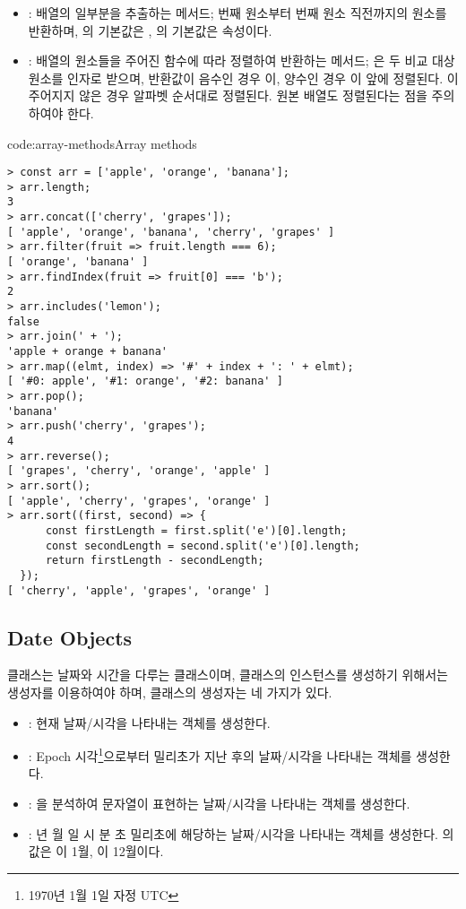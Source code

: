 \begin{itemize}
    \item {}: 배열의 일부분을 추출하는 메서드; 번째 원소부터 번째 원소 직전까지의 원소를 반환하며, 의 기본값은 , 의 기본값은  속성이다.
    \item {}: 배열의 원소들을 주어진 함수에 따라 정렬하여 반환하는 메서드; 은 두 비교 대상 원소를 인자로 받으며, 반환값이 음수인 경우 이, 양수인 경우 이 앞에 정렬된다. 이 주어지지 않은 경우 알파벳 순서대로 정렬된다. 원본 배열도 정렬된다는 점을 주의하여야 한다.
\end{itemize}

\begin{codeenv}{code:array-methods}{Array methods}\begin{verbatim}
> const arr = ['apple', 'orange', 'banana'];
> arr.length;
3
> arr.concat(['cherry', 'grapes']);
[ 'apple', 'orange', 'banana', 'cherry', 'grapes' ]
> arr.filter(fruit => fruit.length === 6);
[ 'orange', 'banana' ]
> arr.findIndex(fruit => fruit[0] === 'b');
2
> arr.includes('lemon');
false
> arr.join(' + ');
'apple + orange + banana'
> arr.map((elmt, index) => '#' + index + ': ' + elmt);
[ '#0: apple', '#1: orange', '#2: banana' ]
> arr.pop();
'banana'
> arr.push('cherry', 'grapes');
4
> arr.reverse();
[ 'grapes', 'cherry', 'orange', 'apple' ]
> arr.sort();
[ 'apple', 'cherry', 'grapes', 'orange' ]
> arr.sort((first, second) => {
      const firstLength = first.split('e')[0].length;
      const secondLength = second.split('e')[0].length;
      return firstLength - secondLength;
  });
[ 'cherry', 'apple', 'grapes', 'orange' ]
\end{verbatim}
\end{codeenv}


\subsection*{Date Objects}

 클래스는 날짜와 시간을 다루는 클래스이며,  클래스의 인스턴스를 생성하기 위해서는 생성자를 이용하여야 하며,  클래스의 생성자는 네 가지가 있다.

\begin{itemize}
    \item {}: 현재 날짜/시각을 나타내는  객체를 생성한다.
    \item {}: Epoch 시각\footnote{1970년 1월 1일 자정 UTC}으로부터 밀리초가 지난 후의 날짜/시각을 나타내는  객체를 생성한다.
    \item {}: 을 분석하여 문자열이 표현하는 날짜/시각을 나타내는  객체를 생성한다.
    \item {}: 년 월 일 시 분 초  밀리초에 해당하는 날짜/시각을 나타내는  객체를 생성한다. 의 값은 이 1월, 이 12월이다.
\end{itemize}

